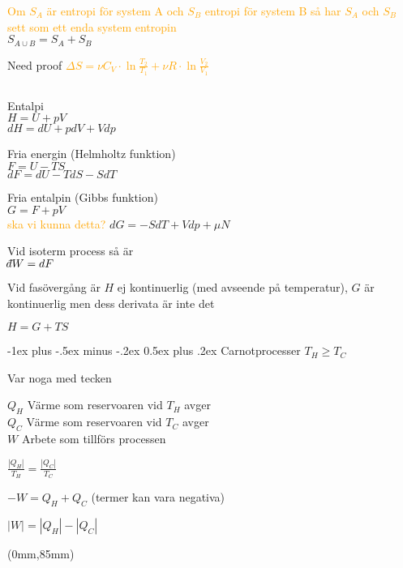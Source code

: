 \documentclass[10pt,landscape]{article}
\makeatletter
\renewcommand{\section}{\@startsection{section}{1}{0mm}%
                                {-1ex plus -.5ex minus -.2ex}%
                                {0.5ex plus .2ex}%
                                {\normalfont\large\bfseries}
                                }
\def\dbar{{\mathchar'26\mkern-12mu d}}
\makeatother
\begin{document}
\begin{multicols}{5}
\textcolor{orange}{Om $S_A$ är entropi för system A och $S_B$ entropi för system B så har
$S_A$ och $S_B$ sett som ett enda system entropin}\\
$S_{A \cup B} = S_A + S_B$

Need proof
\textcolor{orange}{
$\Delta S = \nu C_V \cdot \ln \frac{T_2}{T_1} + \nu R \cdot \ln \frac{V_2}{V_1}$
}

$$$$

Entalpi\\
$H = U + pV$\\
$dH = dU + pdV + Vdp$

Fria energin (Helmholtz funktion)\\
$F = U -TS$\\
$dF = dU - TdS - SdT$

Fria entalpin (Gibbs funktion)\\
$G = F + pV$\\
\textcolor{orange}{ska vi kunna detta?}
$dG = -SdT + Vdp + \mu N$

$$$$
Vid isoterm process så är\\
$\dbar W = dF$

Vid fasövergång är $H$ ej kontinuerlig (med avseende på temperatur), $G$ är kontinuerlig men dess derivata är inte det

$H = G + TS$

\section{Carnotprocesser}
$T_H \ge T_C$

Var noga med tecken

$Q_H$ Värme som reservoaren vid $T_H$ avger\\
$Q_C$ Värme som reservoaren vid $T_C$ avger\\
$W$ Arbete som tillförs processen

$\frac{|Q_H|}{T_H} = \frac{|Q_C|}{T_C}$

$-W = Q_H + Q_C$ (termer kan vara negativa)

$|W| = |Q_H| - |Q_C|$

\end{multicols}


\begin{textblock*}{299mm}(0mm,85mm)
\end{textblock*}
\end{document}

